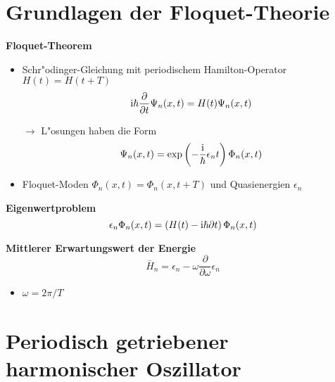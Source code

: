 \section{Grundlagen der Floquet-Theorie}
\begin{frame}
  \textbf{Floquet-Theorem} %
  \begin{itemize}
    \item Schr"odinger-Gleichung mit periodischem Hamilton-Operator $H(t)=H(t+T)$
    \begin{equation}
      \text i\hbar \frac{\partial}{\partial t} \Psi_n(x,t) = H(t)\Psi_n(x,t)
    \end{equation}

    $\rightarrow$ L"osungen haben die Form
    \begin{equation}
      \Psi_n(x,t)=\exp\left(-\frac{\text i}{\hbar}\epsilon_nt\right)\Phi_n(x,t)
    \end{equation}

    \item Floquet-Moden $\Phi_n(x,t)=\Phi_n(x,t+T)$ und Quasienergien $\epsilon_n$
  \end{itemize}

  \textbf{Eigenwertproblem}
  \begin{equation} %
    \epsilon_n \Phi_n(x,t) = \left(H(t)-\text i\hbar \partial t\right) \Phi_n(x,t)
  \end{equation}

  \textbf{Mittlerer Erwartungswert der Energie } %
  \begin{equation}%
    \bar H_n = \epsilon_n-\omega \frac{\partial}{\partial \omega} \epsilon_n
  \end{equation}
  \begin{itemize}
   \item $\omega=2\pi/T$
 \end{itemize}
\end{frame}






\section{Periodisch getriebener harmonischer Oszillator}
